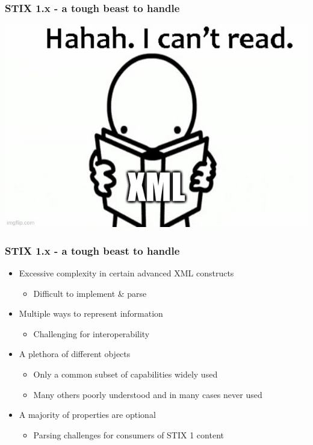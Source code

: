\begin{frame}
    \frametitle{STIX 1.x - a tough beast to handle}
    \centering
    \includegraphics[scale=0.54]{images/xml.jpg}
\end{frame}

\begin{frame}
    \frametitle{STIX 1.x - a tough beast to handle}
    \begin{itemize}
        \item Excessive complexity in certain advanced XML constructs
        \begin{itemize}
            \item Difficult to implement \& parse
        \end{itemize}
        \item Multiple ways to represent information
        \begin{itemize}
            \item Challenging for interoperability
        \end{itemize}
        \item A plethora of different objects
        \begin{itemize}
            \item Only a common subset of capabilities widely used
            \item Many others poorly understood and in many cases never used 
        \end{itemize}
        \item A majority of properties are optional
        \begin{itemize}
            \item Parsing challenges for consumers of STIX 1 content
        \end{itemize}
    \end{itemize}
\end{frame}

